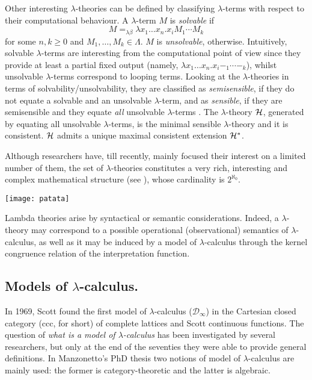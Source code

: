 \documentclass[english]{llncs}
\newcommand{\ro}[1]{\mathscr{#1}} \newcommand{\App}{\mathcal{A}}
\newcommand{\cH}{{\cal H}}
\newcommand{\gl}{\lambda}
\begin{document}
Other interesting $\gl$-theories can be defined by classifying $\gl$-terms with respect to their computational behaviour. 
A $\gl$-term $M$ is {\em solvable} if 
$$ M =_{\gl\beta} \gl x_1\dots x_n.x_iM_1\cdots M_k$$ 
for some $n,k\ge 0$ and $M_1,\ldots,M_k\in\Lambda$.
$M$ is {\em unsolvable}, otherwise. 
Intuitively, solvable $\gl$-terms are interesting from the computational point of view since they provide at least a partial fixed output 
(namely, $\gl x_1\dots x_n.x_i-_1\cdots -_k$), 
whilst unsolvable $\gl$-terms correspond to looping terms.
Looking at the $\gl$-theories in terms of solvability/unsolvability, they are classified as \emph{semisensible}, if they do not equate a solvable and an unsolvable $\gl$-term, and as \emph{sensible}, if they are semisensible and they equate \emph{all} unsolvable $\gl$-terms \cite[Sec.~16, 17]{Bare}.
The $\gl$-theory $\cH$, generated by equating all unsolvable $\gl$-terms, is the minimal sensible $\gl$-theory and it is consistent.
$\cH$ admits a unique maximal consistent extension $\cH^*$.

Although researchers have, till recently, mainly focused their interest on a limited number of them, the set of $\lambda$-theories
constitutes a very rich, interesting and complex mathematical structure (see \cite{Bare,Berline00,Berline06}), whose cardinality is $2^{\aleph_0}$.

\begin{center}
\vspace*{1ex}
\ifx\pdfoutput\undefined
{}
\else
\texttt{[image: patata]}
\fi 
\vspace*{1ex}
\end{center}

Lambda theories arise by syntactical or semantic considerations. 
Indeed, a $\lambda$-theory may correspond to a possible operational (observational) semantics of $\lambda$-calculus, as well as it 
may be induced by a model of $\lambda$-calculus through the kernel congruence relation of the interpretation function.

\subsection{Models of $\lambda$-calculus.} \label{subs:lambda models}

In 1969, Scott found the first model of $\lambda$-calculus ($\ro{D}_\infty$) in the Cartesian closed category (ccc, for short) of complete lattices and 
Scott continuous functions. 
The question of \emph{what is a model of $\lambda$-calculus} has been investigated by several researchers, but only at the end of the seventies
they were able to provide general definitions.
In Manzonetto's PhD thesis \cite{ManzonettoTh} two notions of model of $\lambda$-calculus are mainly used: the former is category-theoretic 
and the latter is algebraic. 
\end{document}
